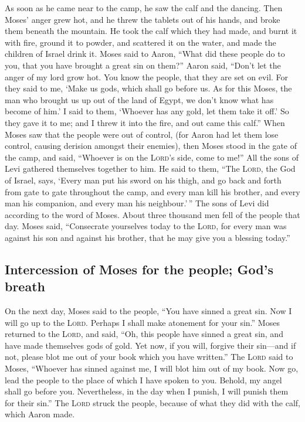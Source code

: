  As soon as he came near to the camp, he saw the calf and
the dancing. Then Moses' anger grew hot, and he threw the tablets out of
his hands, and broke them beneath the mountain.  He took
the calf which they had made, and burnt it with fire, ground it to
powder, and scattered it on the water, and made the children of Israel
drink it.  Moses said to Aaron, ``What did these people
do to you, that you have brought a great sin on them?'' 
Aaron said, ``Don't let the anger of my lord grow hot. You know the
people, that they are set on evil.  For they said to me,
`Make us gods, which shall go before us. As for this Moses, the man who
brought us up out of the land of Egypt, we don't know what has become of
him.'  I said to them, `Whoever has any gold, let them
take it off.' So they gave it to me; and I threw it into the fire, and
out came this calf.''  When Moses saw that the people
were out of control, (for Aaron had let them lose control, causing
derision amongst their enemies),  then Moses stood in the
gate of the camp, and said, ``Whoever is on the \textsc{Lord}'s side,
come to me!'' All the sons of Levi gathered themselves together to him.
 He said to them, ``The \textsc{Lord}, the God of Israel,
says, `Every man put his sword on his thigh, and go back and forth from
gate to gate throughout the camp, and every man kill his brother, and
every man his companion, and every man his neighbour.'\,''
 The sons of Levi did according to the word of Moses.
About three thousand men fell of the people that day. 
Moses said, ``Consecrate yourselves today to the \textsc{Lord}, for
every man was against his son and against his brother, that he may give
you a blessing today.''

\hypertarget{intercession-of-moses-for-the-people-gods-breath}{%
\subsection{Intercession of Moses for the people; God's
breath}\label{intercession-of-moses-for-the-people-gods-breath}}

 On the next day, Moses said to the people, ``You have
sinned a great sin. Now I will go up to the \textsc{Lord}. Perhaps I
shall make atonement for your sin.''  Moses returned to
the \textsc{Lord}, and said, ``Oh, this people have sinned a great sin,
and have made themselves gods of gold.  Yet now, if you
will, forgive their sin---and if not, please blot me out of your book
which you have written.''  The \textsc{Lord} said to
Moses, ``Whoever has sinned against me, I will blot him out of my book.
 Now go, lead the people to the place of which I have
spoken to you. Behold, my angel shall go before you. Nevertheless, in
the day when I punish, I will punish them for their sin.''
 The \textsc{Lord} struck the people, because of what
they did with the calf, which Aaron made.


